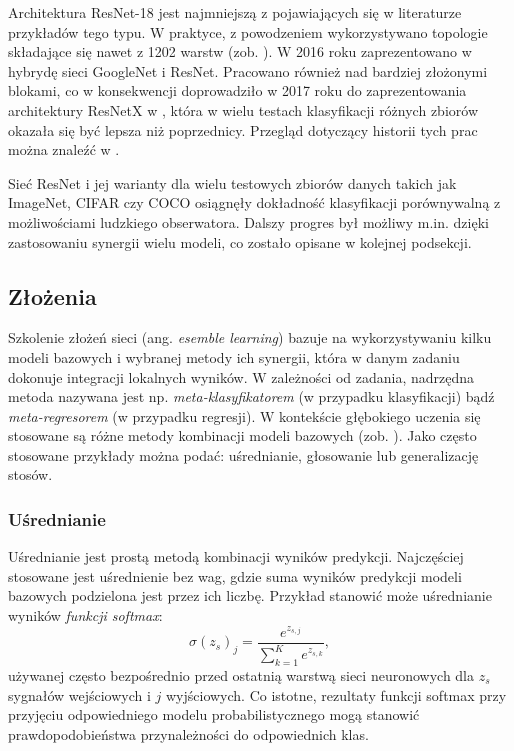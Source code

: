 Architektura ResNet-18 jest najmniejszą z pojawiających się w literaturze przykładów tego typu. W praktyce, z powodzeniem wykorzystywano topologie składające się nawet z 1202 warstw (zob. \cite{ResNet}). W 2016 roku zaprezentowano w \cite{InceptionResNet} hybrydę sieci GoogleNet i ResNet. Pracowano również nad bardziej złożonymi blokami, \linebreak co w konsekwencji doprowadziło w 2017 roku do zaprezentowania architektury ResNetX w \cite{ResNetX}, która w wielu testach klasyfikacji różnych zbiorów okazała się być lepsza niż poprzednicy. Przegląd dotyczący historii tych prac można znaleźć w \cite{ResNetXoverview}.

Sieć ResNet i jej warianty dla wielu testowych zbiorów danych takich jak ImageNet, CIFAR czy COCO \cite{COCO} osiągnęły dokładność klasyfikacji porównywalną \linebreak z możliwościami ludzkiego obserwatora. Dalszy progres był możliwy m.in. dzięki zastosowaniu synergii wielu modeli, co zostało opisane w kolejnej podsekcji.

\subsection{Złożenia}
\label{seq:ensemble}
Szkolenie złożeń sieci (ang. \textit{esemble learning}) bazuje na wykorzystywaniu kilku modeli bazowych i wybranej metody ich synergii, która w danym zadaniu dokonuje integracji lokalnych wyników. W zależności od zadania, nadrzędna metoda nazywana jest np. \textit{meta-klasyfikatorem} (w przypadku klasyfikacji) bądź \textit{meta-regresorem} (w przypadku regresji). W kontekście głębokiego uczenia się stosowane są różne metody kombinacji modeli bazowych (zob. \cite{Ensemble}). Jako często stosowane przykłady można podać: uśrednianie, głosowanie lub generalizację stosów.

\subsubsection{Uśrednianie}
Uśrednianie jest prostą metodą kombinacji wyników predykcji. Najczęściej stosowane jest uśrednienie bez wag, gdzie suma wyników predykcji modeli bazowych podzielona jest przez ich liczbę. Przykład stanowić może uśrednianie wyników \textit{funkcji softmax}:
\begin{equation}
\sigma (z_s)_j= \frac{e^{z_{s,j}}}{\sum_{k=1}^{K} e^{z_{s,k}}},
\end{equation} 
używanej często bezpośrednio przed ostatnią warstwą sieci neuronowych dla $z_s$ sygnałów wejściowych i $j$ wyjściowych. Co istotne, rezultaty funkcji softmax przy przyjęciu odpowiedniego modelu probabilistycznego mogą stanowić prawdopodobieństwa przynależności do odpowiednich klas.


